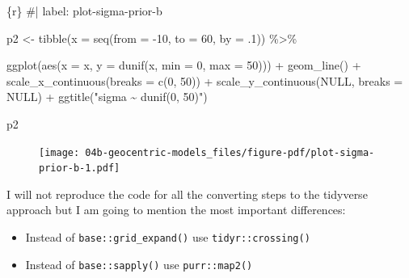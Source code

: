 \documentclass[
  letterpaper,
  DIV=11,
  numbers=noendperiod]{scrreprt}
\newenvironment{Shaded}{\begin{snugshade}}{\end{snugshade}}
\newcommand{\AttributeTok}[1]{\textcolor[rgb]{0.40,0.45,0.13}{#1}}
\newcommand{\CommentTok}[1]{\textcolor[rgb]{0.37,0.37,0.37}{#1}}
\newcommand{\ConstantTok}[1]{\textcolor[rgb]{0.56,0.35,0.01}{#1}}
\newcommand{\DecValTok}[1]{\textcolor[rgb]{0.68,0.00,0.00}{#1}}
\newcommand{\FunctionTok}[1]{\textcolor[rgb]{0.28,0.35,0.67}{#1}}
\newcommand{\InformationTok}[1]{\textcolor[rgb]{0.37,0.37,0.37}{#1}}
\newcommand{\NormalTok}[1]{\textcolor[rgb]{0.00,0.23,0.31}{#1}}
\newcommand{\OtherTok}[1]{\textcolor[rgb]{0.00,0.23,0.31}{#1}}
\newcommand{\SpecialCharTok}[1]{\textcolor[rgb]{0.37,0.37,0.37}{#1}}
\newcommand{\StringTok}[1]{\textcolor[rgb]{0.13,0.47,0.30}{#1}}
\providecommand{\tightlist}{%
  \setlength{\itemsep}{0pt}\setlength{\parskip}{0pt}}\usepackage{longtable,booktabs,array}
\begin{document}
\begin{Shaded}
\begin{Highlighting}[]
\InformationTok{\textasciigrave{}\textasciigrave{}\textasciigrave{}\{r\}}
\CommentTok{\#| label: plot{-}sigma{-}prior{-}b}

\NormalTok{p2 }\OtherTok{\textless{}{-}}
  \FunctionTok{tibble}\NormalTok{(}\AttributeTok{x =} \FunctionTok{seq}\NormalTok{(}\AttributeTok{from =} \SpecialCharTok{{-}}\DecValTok{10}\NormalTok{, }\AttributeTok{to =} \DecValTok{60}\NormalTok{, }\AttributeTok{by =}\NormalTok{ .}\DecValTok{1}\NormalTok{)) }\SpecialCharTok{\%\textgreater{}\%}
  
  \FunctionTok{ggplot}\NormalTok{(}\FunctionTok{aes}\NormalTok{(}\AttributeTok{x =}\NormalTok{ x, }\AttributeTok{y =} \FunctionTok{dunif}\NormalTok{(x, }\AttributeTok{min =} \DecValTok{0}\NormalTok{, }\AttributeTok{max =} \DecValTok{50}\NormalTok{))) }\SpecialCharTok{+}
  \FunctionTok{geom\_line}\NormalTok{() }\SpecialCharTok{+}
  \FunctionTok{scale\_x\_continuous}\NormalTok{(}\AttributeTok{breaks =} \FunctionTok{c}\NormalTok{(}\DecValTok{0}\NormalTok{, }\DecValTok{50}\NormalTok{)) }\SpecialCharTok{+}
  \FunctionTok{scale\_y\_continuous}\NormalTok{(}\ConstantTok{NULL}\NormalTok{, }\AttributeTok{breaks =} \ConstantTok{NULL}\NormalTok{) }\SpecialCharTok{+}
  \FunctionTok{ggtitle}\NormalTok{(}\StringTok{"sigma \textasciitilde{} dunif(0, 50)"}\NormalTok{)}

\NormalTok{p2}
\InformationTok{\textasciigrave{}\textasciigrave{}\textasciigrave{}}
\end{Highlighting}
\end{Shaded}

\begin{figure}[H]

{\centering \texttt{[image: 04b-geocentric-models\_files/figure-pdf/plot-sigma-prior-b-1.pdf]}

}

\end{figure}

I will not reproduce the code for all the converting steps to the
tidyverse approach but I am going to mention the most important
differences:

\begin{itemize}
\tightlist
\item
  Instead of \texttt{base::grid\_expand()} use
  \texttt{tidyr::crossing()}
\item
  Instead of \texttt{base::sapply()} use \texttt{purr::map2()}
\end{itemize}
\end{document}
